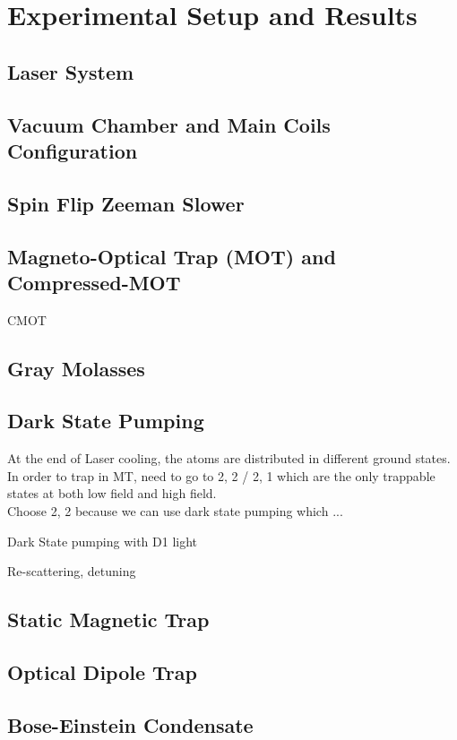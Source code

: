 \chapter{Experimental Setup and Results}

\section{Laser System}

\section{Vacuum Chamber and Main Coils Configuration}

\section{Spin Flip Zeeman Slower}

\section{Magneto-Optical Trap (MOT) and Compressed-MOT}

CMOT

\section{Gray Molasses}

\section{Dark State Pumping}

At the end of Laser cooling, the atoms are distributed in different ground states.\\
In order to trap in MT, need to go to 2, 2 / 2, 1 which are the only trappable states at both low field and high field.\\
Choose 2, 2 because we can use dark state pumping which ...

Dark State pumping with D1 light

Re-scattering, detuning

\section{Static Magnetic Trap}

\section{Optical Dipole Trap}

\section{Bose-Einstein Condensate}
